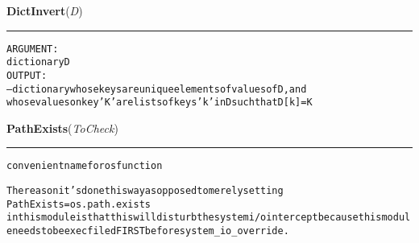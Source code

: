     \label{System:Utils:DictInvert}

    \vspace{0.5ex}

\hspace{.8\funcindent}\begin{boxedminipage}{\funcwidth}

    \raggedright \textbf{DictInvert}(\textit{D})

    \vspace{-1.5ex}

    \rule{\textwidth}{0.5\fboxrule}
\setlength{\parskip}{2ex}
\begin{alltt}

ARGUMENT:
        dictionary D
OUTPUT:
--dictionary whose keys are unique elements of values of D, and 
whose values on key 'K' are lists of keys 'k' in D such that D[k] = K
\end{alltt}

\setlength{\parskip}{1ex}
    \end{boxedminipage}

    \label{System:Utils:PathExists}

    \vspace{0.5ex}

\hspace{.8\funcindent}\begin{boxedminipage}{\funcwidth}

    \raggedright \textbf{PathExists}(\textit{ToCheck})

    \vspace{-1.5ex}

    \rule{\textwidth}{0.5\fboxrule}
\setlength{\parskip}{2ex}
\begin{alltt}

convenient name for os function

The reason it's done this way as opposed to merely setting 
        PathExists = os.path.exists
in this module is that this will disturb the system i/o intercept because this module needs to be execfiled FIRST before system\_io\_override. 
\end{alltt}

\setlength{\parskip}{1ex}
    \end{boxedminipage}

    \label{System:Utils:Rename}


